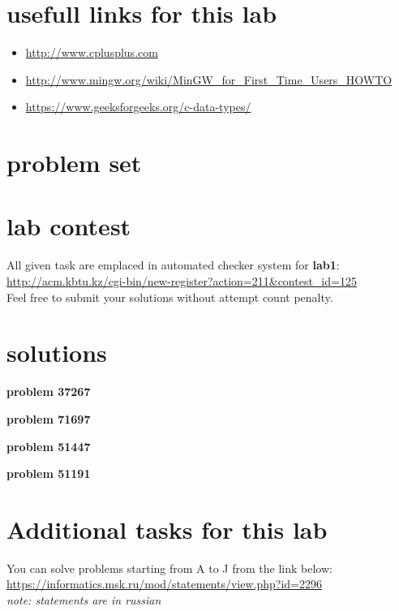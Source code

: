 \documentclass[12pt]{article}%
\begin{document}
    \section{usefull links for this lab}
    \begin{itemize}
        \item \url{http://www.cplusplus.com}
        \item \url{http://www.mingw.org/wiki/MinGW_for_First_Time_Users_HOWTO}
        \item \url{https://www.geeksforgeeks.org/c-data-types/}
    \end{itemize}
    
    \section{problem set}
    
    
    
    

    \section{lab contest}
    
    All given task are emplaced in automated checker system for \textbf{lab1}: \url{http://acm.kbtu.kz/cgi-bin/new-register?action=211&contest_id=125}\\
    Feel free to submit your solutions without attempt count penalty.

    \section{solutions}
    \textbf{problem 37267}
    
    \textbf{problem 71697}
    
    \textbf{problem 51447}
    
    \textbf{problem 51191}
    

    \section{Additional tasks for this lab}
    You can solve problems starting from A to J from the link below:\\
    \url{https://informatics.msk.ru/mod/statements/view.php?id=2296}\\
    \textit{note: statements are in russian}
\end{document}
